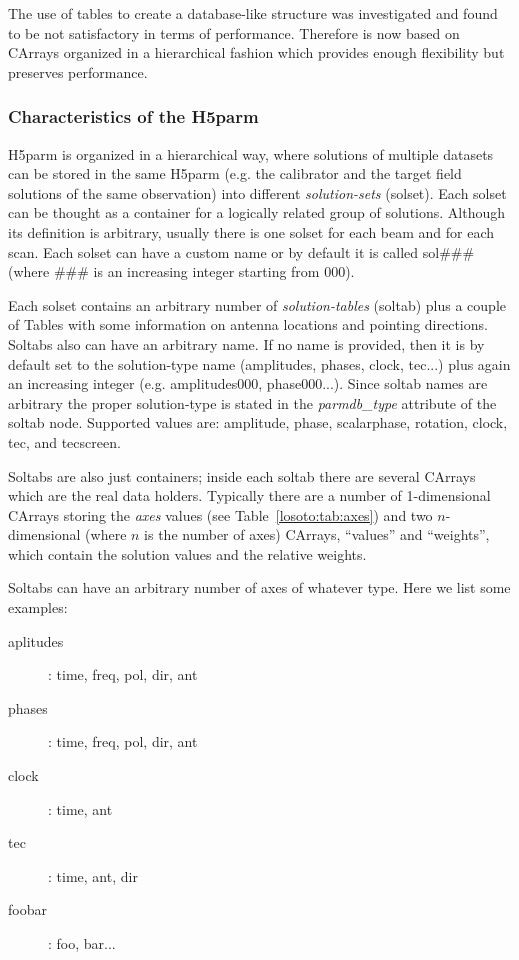 \documentclass[]{article}
\begin{document}
The use of tables to create a database-like structure was investigated and found to be not satisfactory in terms of performance. Therefore \losoto{} is now based on CArrays organized in a hierarchical fashion which provides enough flexibility but preserves performance.

\subsubsection{Characteristics of the H5parm}
\label{losoto:characteristics_h5parm}

H5parm is organized in a hierarchical way, where solutions of multiple datasets can be stored in the same H5parm (e.g. the calibrator and the target field solutions of the same observation) into different \textit{solution-sets} (solset). Each solset can be thought as a container for a logically related group of solutions. Although its definition is arbitrary, usually there is one solset for each beam and for each scan. Each solset can have a custom name or by default it is called sol\#\#\# (where \#\#\# is an increasing integer starting from 000).

Each solset contains an arbitrary number of \textit{solution-tables} (soltab) plus a couple of Tables with some information on antenna locations and pointing directions. Soltabs also can have an arbitrary name. If no name is provided, then it is by default set to the solution-type name (amplitudes, phases, clock, tec...) plus again an increasing integer (e.g. amplitudes000, phase000...). Since soltab names are arbitrary the proper solution-type is stated in the \textit{parmdb\_type} attribute of the soltab node. Supported values are: amplitude, phase, scalarphase, rotation, clock, tec, and tecscreen.

Soltabs are also just containers; inside each soltab there are several CArrays which are the real data holders. Typically there are a number of 1-dimensional CArrays storing the \textit{axes} values (see Table~\ref{losoto:tab:axes}) and two $n$-dimensional (where $n$ is the number of axes) CArrays, ``values'' and ``weights'', which contain the solution values and the relative weights.

Soltabs can have an arbitrary number of axes of whatever type. Here we list some examples:
\begin{description}
 \item[aplitudes]: time, freq, pol, dir, ant
 \item[phases]: time, freq, pol, dir, ant
 \item[clock]: time, ant
 \item[tec]: time, ant, dir
 \item[foobar]: foo, bar...
\end{description}
\end{document}
